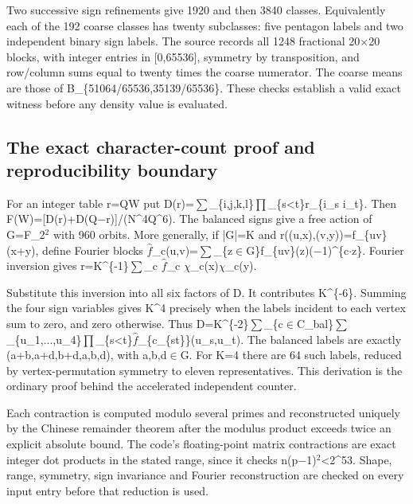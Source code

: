 \documentclass[11pt,a4paper]{article}
\begin{document}
Two successive sign refinements give 1920 and then 3840 classes. Equivalently each of the 192 coarse classes has twenty subclasses: five pentagon labels and two independent binary sign labels. The source records all 1248 fractional 20\ensuremath{\times}20 blocks, with integer entries in [0,65536], symmetry by transposition, and row/column sums equal to twenty times the coarse numerator. The coarse means are those of B\_\{51064/65536,35139/65536\}. These checks establish a valid exact witness before any density value is evaluated.

\subsection{The exact character-count proof and reproducibility boundary}
For an integer table r=QW put D(r)=\ensuremath{\sum}\_\{i,j,k,l\}\ensuremath{\prod}\_\{s<t\}r\_\{i\_s i\_t\}. Then F(W)=[D(r)+D(Q\ensuremath{-}r)]/(N\textasciicircum{}4Q\textasciicircum{}6). The balanced signs give a free action of G=F\_2\ensuremath{^2} with 960 orbits. More generally, if |G|=K and r((u,x),(v,y))=f\_\{uv\}(x+y), define Fourier blocks \ensuremath{\hat{f}}\_c(u,v)=\ensuremath{\sum}\_\{z\ensuremath{\in}G\}f\_\{uv\}(z)(\ensuremath{-}1)\textasciicircum{}\{c\ensuremath{\cdot}z\}. Fourier inversion gives r=K\textasciicircum{}\{-1\}\ensuremath{\sum}\_c \ensuremath{\hat{f}}\_c \ensuremath{\chi}\_c(x)\ensuremath{\chi}\_c(y).

Substitute this inversion into all six factors of D. It contributes K\textasciicircum{}\{-6\}. Summing the four sign variables gives K\textasciicircum{}4 precisely when the labels incident to each vertex sum to zero, and zero otherwise. Thus D=K\textasciicircum{}\{-2\}\ensuremath{\sum}\_\{c\ensuremath{\in}C\_bal\}\ensuremath{\sum}\_\{u\_1,...,u\_4\}\ensuremath{\prod}\_\{s<t\}\ensuremath{\hat{f}}\_\{c\_\{st\}\}(u\_s,u\_t). The balanced labels are exactly (a+b,a+d,b+d,a,b,d), with a,b,d\ensuremath{\in}G. For K=4 there are 64 such labels, reduced by vertex-permutation symmetry to eleven representatives. This derivation is the ordinary proof behind the accelerated independent counter.

Each contraction is computed modulo several primes and reconstructed uniquely by the Chinese remainder theorem after the modulus product exceeds twice an explicit absolute bound. The code's floating-point matrix contractions are exact integer dot products in the stated range, since it checks n(p\ensuremath{-}1)\ensuremath{^2}<2\textasciicircum{}53. Shape, range, symmetry, sign invariance and Fourier reconstruction are checked on every input entry before that reduction is used.
\end{document}
